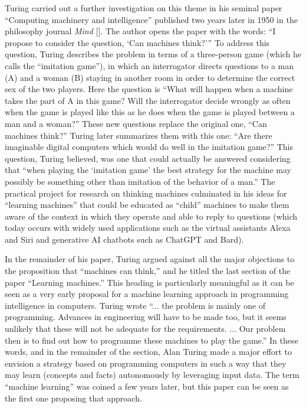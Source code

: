 Turing carried out a further investigation on this theme in his seminal paper ``Computing machinery and intelligence'' published two years later in 1950 in the philosophy journal \textit{Mind} [\citealt{chap:4:Turing:1950}]. The author opens the paper with the words: ``I propose to consider the question, {\textquoteleft}Can machines think?{\textquoteright}'' To address this question, Turing describes the problem in terms of a three-person game (which he calls the ``imitation game''), in which an interrogator directs questions to a man (A) and a woman (B) staying in another room in order to determine the correct sex of the two players. Here the question is ``What will happen when a machine takes the part of A in this game? Will the interrogator decide wrongly as often when the game is played like this as he does when the game is played between a man and a woman?'' These new questions replace the original one, ``Can machines think?'' Turing later summarizes them with this one: ``Are there imaginable digital computers which would do well in the imitation game?'' This question, Turing believed, was one that could actually be answered considering that ``when playing the `imitation game' the best strategy for the machine may possibly be something other than imitation of the behavior of a man.'' The practical project for research on thinking machines culminated in his ideas for ``learning machines'' that could be educated as ``child'' machines to make them aware of the context in which they operate and able to reply to questions (which today occurs with widely used applications such as the virtual assistants Alexa and Siri and generative AI chatbots such as ChatGPT and Bard).

In the remainder of his paper, Turing argued against all the major objections to the proposition that ``machines can think,'' and he titled the last section of the paper ``Learning machines.'' This heading is particularly meaningful as it can be seen as a very early proposal for a machine learning approach in programming intelligence in computers. Turing wrote ``... the problem is mainly one of programming. Advances in engineering will have to be made too, but it seems unlikely that these will not be adequate for the requirements. ... Our problem then is to find out how to programme these machines to play the game.'' In these words, and in the remainder of the section, Alan Turing made a major effort to envision a strategy based on programming computers in such a way that they may learn (concepts and facts) autonomously by leveraging input data. The term ``machine learning'' was coined a few years later, but this paper can be seen as the first one proposing that approach.

